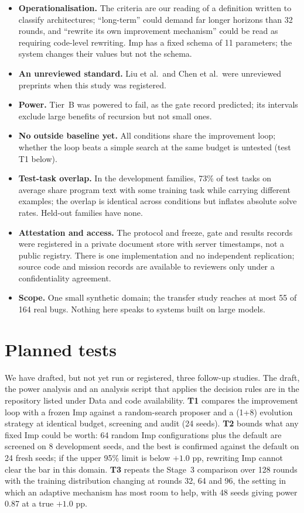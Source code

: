 \documentclass[11pt]{article}
\begin{document}
\begin{itemize}
\item \textbf{Operationalisation.} The criteria are our reading of a definition written to classify architectures; ``long-term'' could demand far longer horizons than 32 rounds, and ``rewrite its own improvement mechanism'' could be read as requiring code-level rewriting. Imp has a fixed schema of 11 parameters; the system changes their values but not the schema.
\item \textbf{An unreviewed standard.} Liu et al.\ and Chen et al.\ were unreviewed preprints when this study was registered.
\item \textbf{Power.} Tier~B was powered to fail, as the gate record predicted; its intervals exclude large benefits of recursion but not small ones.
\item \textbf{No outside baseline yet.} All conditions share the improvement loop; whether the loop beats a simple search at the same budget is untested (test T1 below).
\item \textbf{Test-task overlap.} In the development families, 73\% of test tasks on average share program text with some training task while carrying different examples; the overlap is identical across conditions but inflates absolute solve rates. Held-out families have none.
\item \textbf{Attestation and access.} The protocol and freeze, gate and results records were registered in a private document store with server timestamps, not a public registry. There is one implementation and no independent replication; source code and mission records are available to reviewers only under a confidentiality agreement.
\item \textbf{Scope.} One small synthetic domain; the transfer study reaches at most 55 of 164 real bugs. Nothing here speaks to systems built on large models.
\end{itemize}

\section{Planned tests}\label{sec:next}

We have drafted, but not yet run or registered, three follow-up studies. The draft, the power analysis and an analysis script that applies the decision rules are in the repository listed under Data and code availability. \textbf{T1} compares the improvement loop with a frozen Imp against a random-search proposer and a (1+8) evolution strategy at identical budget, screening and audit (24 seeds). \textbf{T2} bounds what any fixed Imp could be worth: 64 random Imp configurations plus the default are screened on 8 development seeds, and the best is confirmed against the default on 24 fresh seeds; if the upper 95\% limit is below $+1.0$ pp, rewriting Imp cannot clear the bar in this domain. \textbf{T3} repeats the Stage~3 comparison over 128 rounds with the training distribution changing at rounds 32, 64 and 96, the setting in which an adaptive mechanism has most room to help, with 48 seeds giving power 0.87 at a true $+1.0$ pp.
\end{document}

